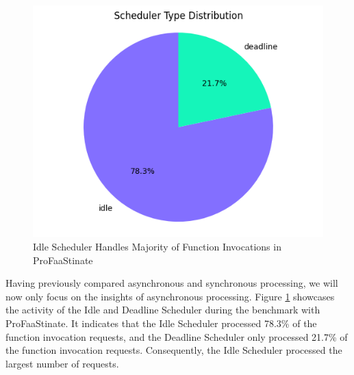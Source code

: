 \begin{figure}
    \centering
    \includegraphics[width=\linewidth]{figures/profaastinate/results/pie_chart.png}
    \caption{
        Idle Scheduler Handles Majority of Function Invocations in ProFaaStinate
    }
    \label{fig:scheduler-distribution}
\end{figure}
Having previously compared asynchronous and synchronous processing, we will now only focus on the insights of asynchronous processing.
Figure \ref{fig:scheduler-distribution} showcases the activity of the Idle and Deadline Scheduler during the benchmark with ProFaaStinate.  It indicates that the Idle Scheduler processed 78.3\% of the function invocation requests, and the Deadline Scheduler only processed 21.7\% of the function invocation requests. Consequently, the Idle Scheduler processed the largest number of requests.

